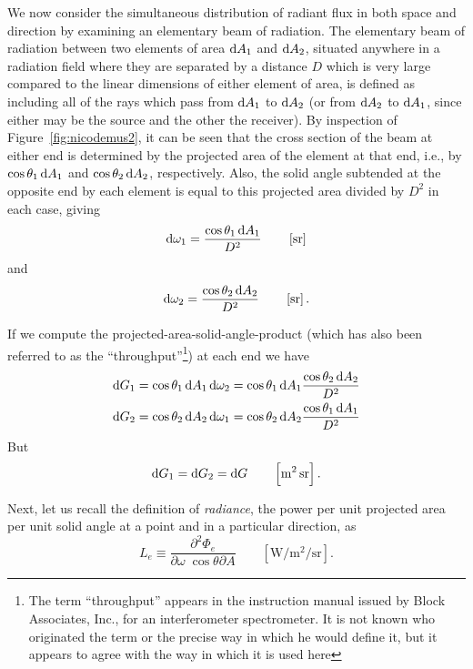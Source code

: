 We now consider the simultaneous distribution of radiant flux in both space
and direction by examining an elementary beam of radiation. The elementary beam
of radiation between two elements of area $\mathop{}\!\mathrm{d} A_1$ and $\mathop{}\!\mathrm{d} A_2$, situated anywhere in
a radiation field where they are separated by a distance $D$ which is very large
compared to the linear dimensions of either element of area, is defined as
including
all of the rays which pass from $\mathop{}\!\mathrm{d} A_1$ to $\mathop{}\!\mathrm{d} A_2$ (or from $\mathop{}\!\mathrm{d} A_2$ to $\mathop{}\!\mathrm{d} A_1$, since either
may be the source and the other the receiver).
By inspection of Figure~\ref{fig:nicodemus2}, it can be seen that the cross
section of
the beam at either end is determined by the projected area of the element at
that end,
i.e., by $\cos\theta_1 \mathop{}\!\mathrm{d} A_1$ and $\cos\theta_2 \mathop{}\!\mathrm{d} A_2$, respectively. Also, the
solid angle
subtended at the opposite end by each element is equal to this projected area
divided by
$D^2$ in each case, giving
\begin{equation*}
\d \omega_1 = \frac{\cos\theta_1 \d A_1}{D^2}
\qquad \left[\si{\steradian}\right]
\end{equation*}
and
\begin{equation}
\d \omega_2 = \frac{\cos\theta_2 \d A_2}{D^2}
\qquad \left[\si{\steradian}\right].
\end{equation}

If we compute the projected-area-solid-angle-product (which has also been
referred
to as the ``throughput''\footnote{\label{note:nicodemus7} The term
``throughput'' appears
in the instruction manual issued by Block Associates, Inc., for an
interferometer
spectrometer. It is not known who originated the term or the precise way in
which
he would define it, but it appears to agree with the way in which it is used
here})
at each end we have
\begin{align*}
\d G_1 &= \cos\theta_1 \d A_1 \d \omega_2 = \cos\theta_1 \d A_1 \frac{\cos\theta_2
\d A_2}{D^2} \\
\d G_2 &= \cos\theta_2 \d A_2 \d \omega_1 = \cos\theta_2 \d A_2 \frac{\cos\theta_1
\d A_1}{D^2}
\end{align*}
But
\begin{equation}
\d G_1 = \d G_2 = \d G
\qquad \left[\si{\square\meter\steradian}\right].
\end{equation}

Next, let us recall the definition of \textsl{radiance}, the power per unit
projected
area per unit solid angle at a point and in a particular direction, as
\begin{equation*}
L_e \equiv \frac{\partial^2 \Phi_e}{\partial\omega\;\cos\theta \partial A}
\qquad \left[\si{\watt\per\square\meter\per\steradian}\right].
\end{equation*}

